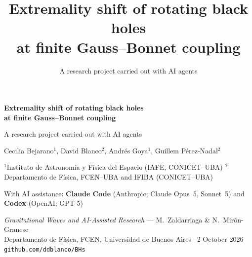 \documentclass[aspectratio=169,11pt]{beamer}
\title{Extremality shift of rotating black holes\\at finite Gauss--Bonnet coupling}
\subtitle{A research project carried out with AI agents}
\begin{document}
\begin{frame}[plain]
\vspace*{0.4cm}
{\LARGE\bfseries\color{accent}Extremality shift of rotating black holes\\[2pt]
at finite Gauss--Bonnet coupling\par}
\vspace{0.25cm}
{\large A research project carried out with AI agents\par}
\vspace{0.55cm}
{\normalsize Cecilia Bejarano$^{1}$, David Blanco$^{2}$, Andrés Goya$^{1}$, Guillem Pérez-Nadal$^{2}$\par}
\vspace{0.12cm}
{\scriptsize\color{muted}$^1$Instituto de Astronomía y Física del Espacio (IAFE, CONICET--UBA)\quad
$^2$Departamento de Física, FCEN--UBA and IFIBA (CONICET--UBA)\par}
\vspace{0.3cm}
{\small With AI assistance: \textbf{Claude Code} (Anthropic; Claude Opus~5, Sonnet~5)
and \textbf{Codex} (OpenAI; GPT-5)\par}
\vfill
{\footnotesize\color{muted}
\emph{Gravitational Waves and AI-Assisted Research} --- M.~Zaldarriaga \& N.~Mirón-Granese\\
Departamento de Física, FCEN, Universidad de Buenos Aires \quad\textperiodcentered{}--2 October 2026
\quad\textperiodcentered{}\quad \texttt{github.com/ddblanco/BHs}\par}
\end{frame}
\end{document}
